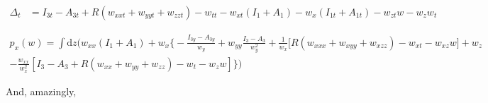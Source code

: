\documentclass[12pt,a4paper]{article}
\begin{document}
	\begin{align}
	  \Delta_t &= I_{3t} - A_{3t} + R \left(w_{xxt} + w_{yyt} + w_{zzt} \right) - w_{tt} - w_{xt} \left( I_1 + A_1 \right) - w_x \left( I_{1t} + A_{1t} \right) - w_{zt} w - w_z w_t
	\end{align}

	\begin{multline}
	  p_x(w) = \int{ \mathrm{d} z} \biggl( w_{xx} \left( I_1 + A_1 \right) + w_x \biggl\{ -\frac{I_{3y} - A_{3y}}{w_y} + w_{yy} \frac{I_3 - A_3}{w_y^2} + \frac{1}{w_x} \biggl[ R \left(w_{xxx} + w_{xyy} + w_{xzz} \right) - w_{xt} - w_{xz} w \biggr] + w_z \\
	  - \frac{w_{xx}}{w_x^2} [ I_3 - A_3 + R \left(w_{xx} + w_{yy} + w_{zz} \right) - w_t - w_z w ] \biggr\} \biggr)
	\end{multline}

	And, amazingly,
\end{document}
